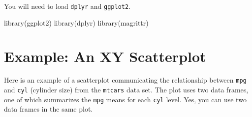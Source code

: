 \documentclass[
  letterpaper,
  DIV=11,
  numbers=noendperiod]{scrartcl}
\newenvironment{Shaded}{\begin{snugshade}}{\end{snugshade}}
\newcommand{\FunctionTok}[1]{\textcolor[rgb]{0.28,0.35,0.67}{#1}}
\newcommand{\NormalTok}[1]{\textcolor[rgb]{0.00,0.23,0.31}{#1}}
\begin{document}
You will need to load \texttt{dplyr} and \texttt{ggplot2}.

\begin{Shaded}
\begin{Highlighting}[]
\FunctionTok{library}\NormalTok{(ggplot2)}
\FunctionTok{library}\NormalTok{(dplyr)}
\FunctionTok{library}\NormalTok{(magrittr)}
\end{Highlighting}
\end{Shaded}

\hypertarget{example-an-xy-scatterplot}{%
\section{\texorpdfstring{\textbf{Example: An XY
Scatterplot}}{Example: An XY Scatterplot}}\label{example-an-xy-scatterplot}}

Here is an example of a scatterplot communicating the relationship
between \texttt{mpg} and \texttt{cyl} (cylinder size) from the
\texttt{mtcars} data set. The plot uses two data frames, one of which
summarizes the \texttt{mpg} means for each \texttt{cyl} level. Yes, you
can use two data frames in the same plot.
\end{document}
